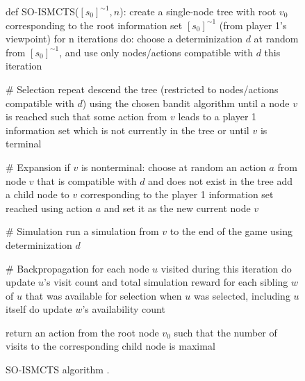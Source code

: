 \begin{figure}[ht]
\begin{code}[commandchars=\\\{\},codes={\catcode`\$=3\catcode`\^=7\catcode`\_=8}]
def SO-ISMCTS($[s_{0}]^{\sim1}, n$):
    create a single-node tree with root $v_{0}$ corresponding to the
        root information set $[s_{0}]^{\sim1}$ (from player 1's viewpoint)
    for n iterations do:
        choose a determinization $d$ at random from $[s_{0}]^{\sim1}$, and
        use only nodes/actions compatible with $d$ this iteration
        
        # Selection
        repeat
            descend the tree (restricted to nodes/actions compatible 
            with $d$) using the chosen bandit algorithm
        until a node $v$ is reached such that some action from $v$ leads
        to a player 1 information set which is not
        currently in the tree or until $v$ is terminal
        
        # Expansion
        if $v$ is nonterminal:
            choose at random an action $a$ from node $v$ that is
            compatible with $d$ and does not exist in the tree
            add a child node to $v$ corresponding to the player
            1 information set reached using action $a$ and set
            it as the new current node $v$

        # Simulation
        run a simulation from $v$ to the end of the game using
        determinization $d$

        # Backpropagation
        for each node $u$ visited during this iteration do
            update $u$'s visit count and total simulation reward
            for each sibling $w$ of $u$ that was available for
            selection when $u$ was selected, including $u$ itself do
                update $w$'s availability count

    return an action from the root node $v_{0}$ such that the
    number of visits to the corresponding child node is maximal
\end{code}
\caption{SO-ISMCTS algorithm \cite{Cowling12}.}\label{figrw:soismcts}
\end{figure}
